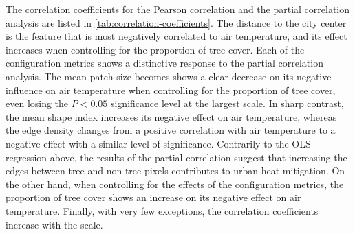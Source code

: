 \documentclass[12pt]{iopart}
\begin{document}
The correlation coefficients for the Pearson correlation and the partial correlation analysis are listed in \autoref{tab:correlation-coefficients}. The distance to the city center is the feature that is most negatively correlated to air temperature, and its effect increases when controlling for the proportion of tree cover. Each of the configuration metrics shows a distinctive response to the partial correlation analysis. The mean patch size becomes shows a clear decrease on its negative influence on air temperature when controlling for the proportion of tree cover, even losing the $P < 0.05$ significance level at the largest scale. In sharp contrast, the mean shape index increases its negative effect on air temperature, whereas the edge density changes from a positive correlation with air temperature to a negative effect with a similar level of significance. Contrarily to the OLS regression above, the results of the partial correlation suggest that increasing the edges between tree and non-tree pixels contributes to urban heat mitigation. On the other hand, when controlling for the effects of the configuration metrics, the proportion of tree cover shows an increase on its negative effect on air temperature. Finally, with very few exceptions, the correlation coefficients increase with the scale. 
\end{document}
